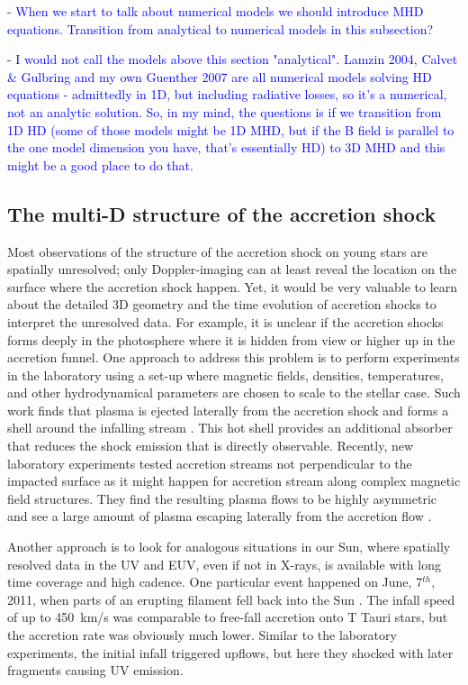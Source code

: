 \textcolor{blue}{
- When we start to talk about numerical models we should introduce MHD equations. Transition from analytical to numerical models in this subsection?}

\textcolor{blue}{- I would not call the models above this section "analytical". Lamzin 2004, Calvet \& Gulbring and my own Guenther 2007 are all numerical models solving HD equations - admittedly in 1D, but including radiative losses, so it's a numerical, not an analytic solution. So, in my mind, the questions is if we transition from 1D HD (some of those models might be 1D MHD, but if the B field is parallel to the one model dimension you have, that's essentially HD) to 3D MHD and this might be a good place to do that.}

\subsection{The multi-D structure of the accretion shock}

Most observations of the structure of the accretion shock on young stars are spatially unresolved; only Doppler-imaging can at least reveal the location on the surface where the accretion shock happen. Yet, it would be very valuable to learn about the detailed 3D geometry and the time evolution of accretion shocks to interpret the unresolved data. For example, it is unclear if the accretion shocks forms deeply in the photosphere where it is hidden from view or higher up in the accretion funnel. One approach to address this problem is to perform experiments in the laboratory using a set-up where magnetic fields, densities, temperatures, and other hydrodynamical parameters are chosen to scale to the stellar case. Such work finds that plasma is ejected laterally from the accretion shock and forms a shell around the infalling stream \cite{2017SciA....3E0982R} . This hot shell provides an additional absorber that reduces the shock emission that is directly observable. Recently, new laboratory experiments tested accretion streams not perpendicular to the impacted surface as it might happen for accretion stream along complex magnetic field structures. They find the resulting plasma flows to be highly asymmetric and see a large amount of plasma escaping laterally from the accretion flow \cite{2020A&A...642A..38B}.  

Another approach is to look for analogous situations in our Sun, where spatially resolved data in the UV and EUV, even if not in X-rays, is available with long time coverage and high cadence. One particular event happened on June, 7$^{th}$, 2011, when parts of an erupting filament fell back into the Sun \cite{2013Sci...341..251R,2013A&A...559A.127O}. The infall speed of up to 450~km/s was comparable to free-fall accretion onto T Tauri stars, but the accretion rate was obviously much lower. Similar to the laboratory experiments, the initial infall triggered upflows, but here they shocked with later fragments causing UV emission.


